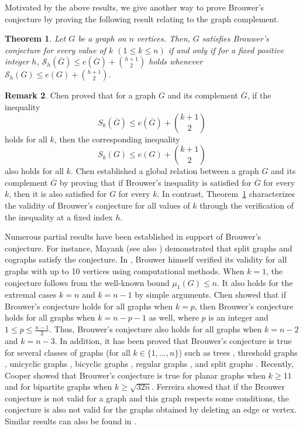 \documentclass[12pt]{article}
\theoremstyle{plain}
\newtheorem{theorem}{Theorem}[section]
\theoremstyle{definition}
\newtheorem{remark}[theorem]{Remark}
\begin{document}
Motivated by the above results, we give another way to prove Brouwer's conjecture by proving the following result relating to the graph complement.
 
\begin{theorem} \label{samt}
Let $G$ be a graph on $n$ vertices. Then, $G$ satisfies Brouwer’s conjecture for every value of $k$ $(1\leq k \leq n)$ if and only if for a fixed positive integer $h$, $\mathcal{S}_h(\overline{G})\leq e(\overline{G})+\binom{h+1}{2}$ holds whenever $\mathcal{S}_h(G)\leq e(G)+\binom{h+1}{2}$.
\end{theorem}
 \begin{remark}
 	Chen \cite{Chen2019} proved that for a graph $G$ and its complement $\overline{G}$, if the inequality
 	$$
 	S_k(\overline{G}) \leq e(\overline{G}) + \binom{k+1}{2}
 	$$
 	holds for all $k$, then the corresponding inequality
 	$$
 	S_k(G) \leq e(G) + \binom{k+1}{2}
 	$$
 	also holds for all $k$. Chen established a global relation between a graph $G$ and its complement $\overline{G}$ by proving that if Brouwer’s inequality is satisfied for $\overline{G}$ for every $k$, then it is also satisfied for $G$ for every $k$. In contrast, Theorem~\ref{samt} characterizes the validity of Brouwer’s conjecture for all values of $k$ through the verification of the inequality at a fixed index $h$.
 \end{remark}
Numerous partial results have been established in support of Brouwer’s conjecture. For instance, Mayank \cite{Mayank2010} (see also \cite{Chen2018a}) demonstrated that split graphs and cographs satisfy the conjecture. In \cite{Brouwer2012}, Brouwer himself verified its validity for all graphs with up to 10 vertices using computational methods. When $k = 1$, the conjecture follows from the well-known bound $\mu_1(G) \leq n$. It also holds for the extremal cases $k = n$ and $k = n-1$ by simple arguments. Chen \cite{Chen2019} showed that if Brouwer's conjecture holds for all graphs when $k=p$, then Brouwer's conjecture holds for all graphs when $k=n-p-1$ as well, where $p$ is an integer and $1 \leq p \leq \frac{n-1}{2}$. Thus, Brouwer's conjecture also holds for all graphs when $k=n-2$ and $k=n-3$. In addition, it has been proved that Brouwer's conjecture is true for several classes of graphs (for all $k\in\{1,\ldots,n\}$) such as trees \cite{Haemers2010}, threshold graphs \cite{Haemers2010}, unicyclic graphs \cite{Du2012, Fritscher2011}, bicyclic graphs \cite{Du2012}, regular graphs \cite{Mayank2010}, and split graphs \cite{Mayank2010}. Recently, Cooper \cite{Cooper2021} showed that Brouwer's conjecture is true for planar graphs when $k\geq 11$ and for bipartite graphs when $k\geq\sqrt{32n}$. Ferreira \cite{Ferreira2021} showed that if the Brouwer conjecture is not valid for a graph and this graph respects some conditions, the conjecture is also not valid for the graphs obtained by deleting an edge or vertex. Similar results can also be found in \cite{Chen2018b, Ganie2020, Vladimir2019, Wang2012}. 
 
\end{document}
